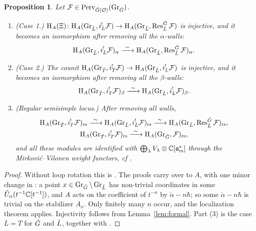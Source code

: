 \documentclass{article}
\theoremstyle{plain}
\newtheorem{proposition}[theorem]{Proposition}
\theoremstyle{definition}
\theoremstyle{remark}
\numberwithin{equation}{section}
\begin{document}
\begin{proposition}\label{prop:geom-loc}
Let $\mathcal{F}\in\operatorname{Perv}_{{\check{G}}(\mathcal{O})}(\operatorname{Gr}_{{\check{G}}})$.
\begin{enumerate}[label=(\arabic*)]
\item (Case 1.) $\mathrm{H}_A(\Xi)\colon\mathrm{H}_A(\operatorname{Gr}_{\check{L}},i_L^!\mathcal{F})\to\mathrm{H}_A(\operatorname{Gr}_{\check{L}},\operatorname{Res}^{{\check{G}}}_{\check{L}}\mathcal{F})$ is injective, and it becomes an isomorphism after removing all the $\alpha$-walls:
\begin{equation}\label{eq:case1-geom}
\H_A(\GrL,i_L^!\calF)_\alpha\xrightarrow{\ \sim\ }\H_A(\GrL,\Res^{\cG}_{\cL}\calF)_\alpha .
\end{equation}
\item (Case 2.) The counit $\mathrm{H}_A(\operatorname{Gr}_{{\check{T}}},i_T^!\mathcal{F})\to\mathrm{H}_A(\operatorname{Gr}_{\check{L}},i_L^!\mathcal{F})$ is injective, and it becomes an isomorphism after removing all the $\beta$-walls:
\begin{equation}\label{eq:case2-geom}
\H_A(\GrT,i_T^!\calF)_\beta\xrightarrow{\ \sim\ }\H_A(\GrL,i_L^!\calF)_\beta .
\end{equation}
\item (Regular semisimple locus.) After removing all walls,
\begin{equation}\label{eq:rs-geom}
\begin{gathered}
\H_A(\GrT,i_T^!\calF)_\rs\xrightarrow{\ \sim\ }\H_A(\GrL,i_L^!\calF)_\rs\xrightarrow{\ \sim\ }\H_A(\GrL,\Res^{\cG}_{\cL}\calF)_\rs,\\
\H_A(\GrT,i_T^!\calF)_\rs\xrightarrow{\ \sim\ }\H_A(\GrG,\calF)_\rs ,
\end{gathered}
\end{equation}
and all these modules are identified with $\bigoplus_{\lambda}V_\lambda\otimes\mathbb{C}[\mathfrak{a}^*_{\mathrm{rs}}]$ through the Mirkovi\'c--Vilonen weight functors, cf \cite{mirkovic2018geometriclanglandsdualityrepresentations}.
\end{enumerate}
\end{proposition}

\begin{proof}
Without loop rotation this is \cite[Propositions 2.1.6, 2.6.7]{macerato2023leviequivariantrestrictionsphericalperverse}. The proofs carry over to $A$, with one minor change in \cite[Proposition 2.1.5]{macerato2023leviequivariantrestrictionsphericalperverse}: a point $x\in\operatorname{Gr}_{{\check{G}}}\setminus\operatorname{Gr}_{\check{L}}$ has  non-trivial coordinates in some $\check{U}_{\alpha}(t^{-1}\mathbb{C}[t^{-1}])$, and $A$ acts on the coefficient of $t^{-n}$ by $\check\alpha-n\hbar$; so some $\check\alpha-n\hbar$ is trivial on the stabilizer $A_x$. Only finitely many $n$ occur, and the localization theorem \cite[Theorem A.1.13]{macerato2023leviequivariantrestrictionsphericalperverse} applies. Injectivity follows from Lemma~\ref{lem:formal}. Part (3) is the case $L=T$ for ${\check{G}}$ and $\check{L}$, together with \cite[\S3.5]{bezrukavnikov2026equivariantsatakecategorykostantwhittaker}.
\end{proof}
\end{document}
